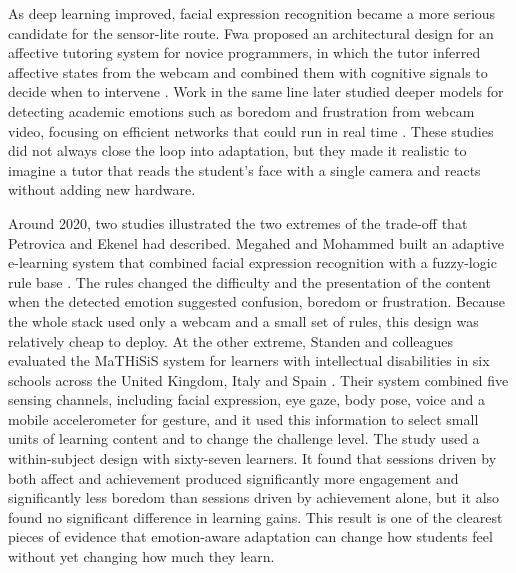 As deep learning improved, facial expression recognition became a more serious candidate for the sensor-lite route. Fwa proposed an architectural design for an affective tutoring system for novice programmers, in which the tutor inferred affective states from the webcam and combined them with cognitive signals to decide when to intervene \cite{fwa_architectural_2018}. Work in the same line later studied deeper models for detecting academic emotions such as boredom and frustration from webcam video, focusing on efficient networks that could run in real time \cite{leong_deep_2020}. These studies did not always close the loop into adaptation, but they made it realistic to imagine a tutor that reads the student's face with a single camera and reacts without adding new hardware.

Around 2020, two studies illustrated the two extremes of the trade-off that Petrovica and Ekenel had described. Megahed and Mohammed built an adaptive e-learning system that combined facial expression recognition with a fuzzy-logic rule base \cite{megahed_modeling_2020}. The rules changed the difficulty and the presentation of the content when the detected emotion suggested confusion, boredom or frustration. Because the whole stack used only a webcam and a small set of rules, this design was relatively cheap to deploy. At the other extreme, Standen and colleagues evaluated the MaTHiSiS system for learners with intellectual disabilities in six schools across the United Kingdom, Italy and Spain \cite{standen_evaluation_2020}. Their system combined five sensing channels, including facial expression, eye gaze, body pose, voice and a mobile accelerometer for gesture, and it used this information to select small units of learning content and to change the challenge level. The study used a within-subject design with sixty-seven learners. It found that sessions driven by both affect and achievement produced significantly more engagement and significantly less boredom than sessions driven by achievement alone, but it also found no significant difference in learning gains. This result is one of the clearest pieces of evidence that emotion-aware adaptation can change how students feel without yet changing how much they learn.


